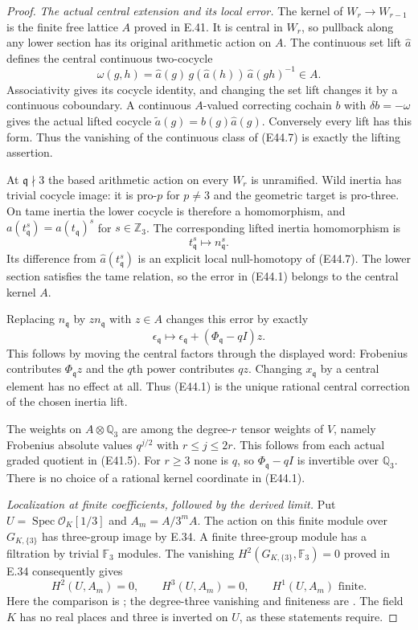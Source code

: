 \begin{proof}
\emph{The actual central extension and its local error.}
The kernel of $W_r\to W_{r-1}$ is the finite
free lattice $A$ proved in E.41. It is central
in $W_r$, so pullback along any lower section
has its original arithmetic action on $A$.
The continuous set lift $\widehat a$ defines
the central continuous two-cocycle
\[
 \omega(g,h)=\widehat a(g)\,
       g(\widehat a(h))\,\widehat a(gh)^{-1}\in A.
 \tag{E44.7}
\]
Associativity gives its cocycle identity,
and changing the set lift changes it by
a continuous coboundary. A continuous
$A$-valued correcting cochain $b$ with
$\delta b=-\omega$ gives the actual lifted
cocycle $\widetilde a(g)=b(g)\widehat a(g)$.
Conversely every lift has this form. Thus
the vanishing of the continuous class of
(E44.7) is exactly the lifting assertion.

At $\mathfrak q\nmid3$ the based arithmetic
action on every $W_r$ is unramified. Wild
inertia has trivial cocycle image: it is
pro-$p$ for $p\ne3$ and the geometric
target is pro-three. On tame inertia the
lower cocycle is therefore a homomorphism,
and
$a(t_{\mathfrak q}^s)=a(t_{\mathfrak q})^s$
for $s\in\mathbb Z_3$. The corresponding
lifted inertia homomorphism is
\[
 t_{\mathfrak q}^s\longmapsto n_{\mathfrak q}^s.
 \tag{E44.8}
\]
Its difference from
$\widehat a(t_{\mathfrak q}^s)$ is an
explicit local null-homotopy of (E44.7).
The lower section satisfies the tame
relation, so the error in (E44.1) belongs
to the central kernel $A$.

Replacing $n_{\mathfrak q}$ by
$z n_{\mathfrak q}$ with $z\in A$ changes
this error by exactly
\[
 \epsilon_{\mathfrak q}\longmapsto
    \epsilon_{\mathfrak q}+(\Phi_{\mathfrak q}-qI)z.
 \tag{E44.9}
\]
This follows by moving the central factors
through the displayed word: Frobenius
contributes $\Phi_{\mathfrak q}z$ and the
$q$th power contributes $qz$.
Changing $x_{\mathfrak q}$ by a central
element has no effect at all. Thus (E44.1)
is the unique rational central correction
of the chosen inertia lift.

The weights on $A\otimes\mathbb Q_3$ are
among the degree-$r$ tensor weights of
$V$, namely Frobenius absolute values
$q^{j/2}$ with $r\le j\le2r$.
This follows from each actual graded
quotient in (E41.5). For $r\ge3$ none is
$q$, so $\Phi_{\mathfrak q}-qI$ is
invertible over $\mathbb Q_3$. There is
no choice of a rational kernel coordinate
in (E44.1).

\emph{Localization at finite coefficients, followed by the derived limit.}
Put $U=\operatorname{Spec}\mathcal O_K[1/3]$
and $A_m=A/3^mA$. The action on this finite
module over $G_{K,\{3\}}$ has three-group
image by E.34. A finite three-group module
has a filtration by trivial
$\mathbb F_3$ modules. The vanishing
$H^2(G_{K,\{3\}},\mathbb F_3)=0$ proved
in E.34 consequently gives
\[
 H^2(U,A_m)=0,\qquad H^3(U,A_m)=0,
             \qquad H^1(U,A_m)\text{ finite}.
 \tag{E44.10}
\]
Here the comparison is
\cite[II.2.9]{E_MilneADT}; the degree-three
vanishing and finiteness are
\cite[I.4.10(c), I.4.15]{E_MilneADT}.
The field $K$ has no real places and
three is inverted on $U$, as these
statements require.


\end{proof}
